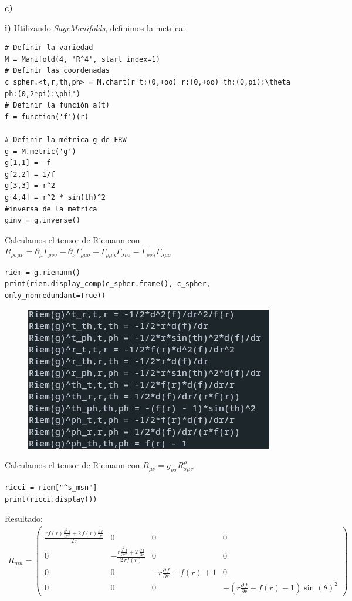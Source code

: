 \documentclass{article}
\begin{document}
\hfill 

\hfill 

\textbf{c) } 

\hfill 

\textbf{i)} Utilizando \textit{SageManifolds}, definimos la metrica:
\begin{verbatim}
# Definir la variedad
M = Manifold(4, 'R^4', start_index=1)
# Definir las coordenadas
c_spher.<t,r,th,ph> = M.chart(r't:(0,+oo) r:(0,+oo) th:(0,pi):\theta ph:(0,2*pi):\phi')
# Definir la función a(t)
f = function('f')(r)

# Definir la métrica g de FRW
g = M.metric('g')
g[1,1] = -f
g[2,2] = 1/f
g[3,3] = r^2
g[4,4] = r^2 * sin(th)^2
#inversa de la metrica 
ginv = g.inverse()
\end{verbatim}

\hfill 

\hfill 

\hfill

Calculamos el tensor de Riemann con $ R_{\rho\sigma\mu\nu} = \partial_\mu \Gamma_{\rho\nu\sigma} - \partial_\nu \Gamma_{\rho\mu\sigma} + \Gamma_{\rho\mu\lambda} \Gamma_{\lambda\nu\sigma} - \Gamma_{\rho\nu\lambda} \Gamma_{\lambda\mu\sigma} $

\begin{verbatim}
riem = g.riemann()
print(riem.display_comp(c_spher.frame(), c_spher, only_nonredundant=True))
\end{verbatim}
\begin{figure}[H]
    \centering
    \includegraphics[width=0.35\linewidth]{rieman_metodo1.png}
\end{figure}

\hfill 

\hfill 

\hfill

Calculamos el tensor de Riemann con $ R _{\mu\nu} = g _{\rho\sigma} R _{\sigma\mu\nu}^\rho  $
\begin{verbatim}
ricci = riem["^s_msn"]
print(ricci.display())
\end{verbatim}
Resultado: 
\begin{gather*}
  R_{mn} = \left(\begin{array}{rrrr}
  \frac{r f\left(r\right) \frac{\partial^2\,f}{\partial r ^ 2} + 2 \, f\left(r\right) \frac{\partial\,f}{\partial r}}{2 \, r} & 0 & 0 & 0 \\
  0 & -\frac{r \frac{\partial^2\,f}{\partial r ^ 2} + 2 \, \frac{\partial\,f}{\partial r}}{2 \, r f\left(r\right)} & 0 & 0 \\
  0 & 0 & -r \frac{\partial\,f}{\partial r} - f\left(r\right) + 1 & 0 \\
  0 & 0 & 0 & -{\left(r \frac{\partial\,f}{\partial r} + f\left(r\right) - 1\right)} \sin\left({\theta}\right)^{2}
  \end{array}\right) 
\end{gather*}
\end{document}

